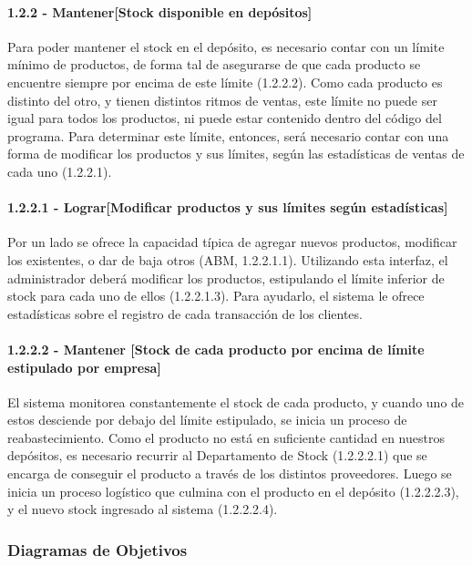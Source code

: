 \paragraph{1.2.2 - Mantener[Stock disponible en depósitos]} \label{para:1.2.2}

Para poder mantener el stock en el depósito, es necesario contar con un límite
mínimo de productos, de forma tal de asegurarse de que cada producto se
encuentre siempre por encima de este límite (1.2.2.2). Como cada producto es
distinto del otro, y tienen distintos ritmos de ventas, este límite no puede ser
igual para todos los productos, ni puede estar contenido dentro del código del
programa. Para determinar este límite, entonces, será necesario contar con una
forma de modificar los productos y sus límites, según las estadísticas de ventas
de cada uno (1.2.2.1).

\paragraph{1.2.2.1 - Lograr[Modificar productos y sus límites según estadísticas]} \label{para:1.2.2.1}

Por un lado se ofrece la capacidad típica de agregar nuevos productos, modificar
los existentes, o dar de baja otros (ABM, 1.2.2.1.1). Utilizando esta interfaz,
el administrador deberá modificar los productos, estipulando el límite inferior
de stock para cada uno de ellos (1.2.2.1.3). Para ayudarlo, el sistema le ofrece
estadísticas sobre el registro de cada transacción de los clientes.

\paragraph{1.2.2.2 - Mantener [Stock de cada producto por encima de límite estipulado por empresa]} \label{para:1.2.2.2}

El sistema monitorea constantemente el stock de cada producto, y cuando uno de
estos desciende por debajo del límite estipulado, se inicia un proceso de
reabastecimiento. Como el producto no está en suficiente cantidad en nuestros
depósitos, es necesario recurrir al Departamento de Stock (1.2.2.2.1) que se
encarga de conseguir el producto a través de los distintos proveedores. Luego se
inicia un proceso logístico que culmina con el producto en el depósito
(1.2.2.2.3), y el nuevo stock ingresado al sistema (1.2.2.2.4).

\subsubsection{Diagramas de Objetivos}


